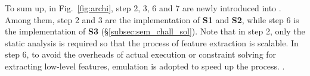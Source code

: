 To sum up, in Fig.~\ref{fig:archi}, step 2, 3, 6 and 7 are newly introduced into \toolNew. Among them, step 2 and 3 are the implementation of \textbf{S1} and \textbf{S2}, while step 6 is the implementation of \textbf{S3} (\S\ref{subsec:sem_chall_sol}). Note that in step 2, only the static analysis is required so that the process of feature extraction is scalable. In step 6, to avoid the overheads of actual execution or constraint solving for extracting low-level features, emulation is adopted to speed up the process. .

